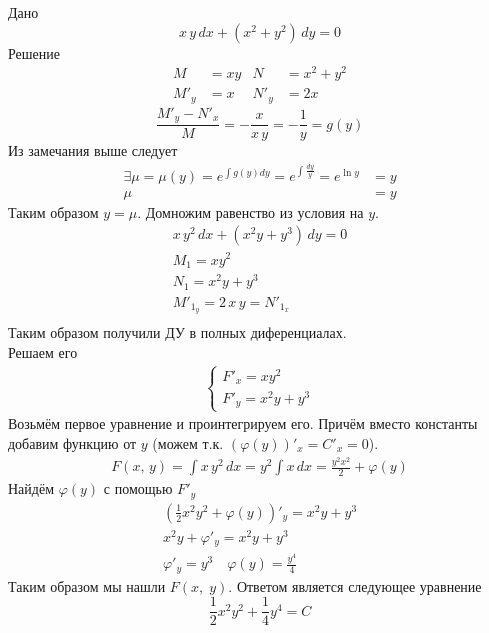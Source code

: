 \begin{Example}
    Дано
    \[
        x\,y\,dx+(x^2+y^2)\,dy=0
    \]
    Решение
    \begin{align*}
        M&=xy & N&=x^2+y^2\\
        M'_y&=x & N'_y&=2x
    \end{align*}
    \[
        \frac{M'_y-N'_x}{M}=-\frac{x}{x\,y}=-\frac{1}{y}=g(y)
    \]
    Из замечания выше следует
    \begin{align*}  
        \exists \mu=\mu(y)=e^{\int g(y)dy}=e^{\int \frac{dy}{y}}=e^{\ln y}&=y\\
        \mu&=y
    \end{align*}
    Таким образом $y=\mu$. Домножим равенство из условия на $y$.
    \begin{gather*} 
        x\,y^2\,dx+(x^2y+y^3)\,dy=0\\
        M_1=xy^2\\
        N_1=x^2y+y^3\\
        M'_{1_y}=2\,x\,y=N'_{1_x}\\
    \end{gather*}
    Таким образом получили ДУ в полных диференциалах.\\
    Решаем его
    \begin{gather*} 
        \begin{cases}
            F'_x=xy^2\\
            F'_y=x^2y+y^3
        \end{cases}
    \end{gather*}
    Возьмём первое уравнение и проинтегрируем его. Причём вместо константы добавим функцию от $y$ (можем т.к. $(\varphi(y))'_x = C'_x = 0$).
    \begin{gather*} 
        F(x,\,y) = \int x\,y^2\,dx=y^2\int x\,dx=\frac{y^2 x^2}{2}+\varphi(y)
    \end{gather*}
    Найдём $\varphi(y)$ с помощью $F'_y$
    \begin{gather*} 
        (\frac{1}{2}x^2y^2+\varphi(y))'_y=x^2y+y^3\\
        x^2y+\varphi'_y=x^2y+y^3\\
        \varphi'_y=y^3 \quad \varphi(y)=\frac{y^4}{4}
    \end{gather*}
    Таким образом мы нашли $F(x,\;y)$. Ответом является следующее уравнение
    \begin{equation*}
        \frac{1}{2}x^2y^2+\frac{1}{4}y^4 = C
    \end{equation*}
\end{Example}
